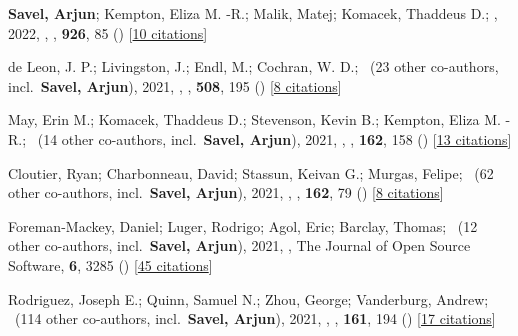 \item[{\color{numcolor}\scriptsize8}] \textbf{Savel, Arjun}; Kempton, Eliza M. -R.; Malik, Matej; Komacek, Thaddeus D.; \etal, 2022, , \apj, \textbf{926}, 85 () [\href{https://ui.adsabs.harvard.edu/abs/2022ApJ...926...85S}{10 citations}]

\item[{\color{numcolor}\scriptsize7}] de Leon, J. P.; Livingston, J.; Endl, M.; Cochran, W. D.; \etal\ ({23} other co-authors, incl.\ \textbf{Savel, Arjun}), 2021, , \mnras, \textbf{508}, 195 () [\href{https://ui.adsabs.harvard.edu/abs/2021MNRAS.508..195D}{8 citations}]

\item[{\color{numcolor}\scriptsize6}] May, Erin M.; Komacek, Thaddeus D.; Stevenson, Kevin B.; Kempton, Eliza M. -R.; \etal\ ({14} other co-authors, incl.\ \textbf{Savel, Arjun}), 2021, , \aj, \textbf{162}, 158 () [\href{https://ui.adsabs.harvard.edu/abs/2021AJ....162..158M}{13 citations}]

\item[{\color{numcolor}\scriptsize5}] Cloutier, Ryan; Charbonneau, David; Stassun, Keivan G.; Murgas, Felipe; \etal\ ({62} other co-authors, incl.\ \textbf{Savel, Arjun}), 2021, , \aj, \textbf{162}, 79 () [\href{https://ui.adsabs.harvard.edu/abs/2021AJ....162...79C}{8 citations}]

\item[{\color{numcolor}\scriptsize4}] Foreman-Mackey, Daniel; Luger, Rodrigo; Agol, Eric; Barclay, Thomas; \etal\ ({12} other co-authors, incl.\ \textbf{Savel, Arjun}), 2021, , The Journal of Open Source Software, \textbf{6}, 3285 () [\href{https://ui.adsabs.harvard.edu/abs/2021JOSS....6.3285F}{45 citations}]

\item[{\color{numcolor}\scriptsize3}] Rodriguez, Joseph E.; Quinn, Samuel N.; Zhou, George; Vanderburg, Andrew; \etal\ ({114} other co-authors, incl.\ \textbf{Savel, Arjun}), 2021, , \aj, \textbf{161}, 194 () [\href{https://ui.adsabs.harvard.edu/abs/2021AJ....161..194R}{17 citations}]

